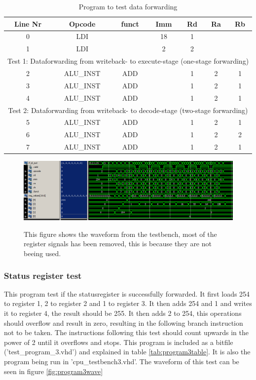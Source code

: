 \documentclass[11pt]{report}
\begin{document}
\begin{table}[htbp]
  \centering
  \begin{tabular}{|c|c|c|c|c|c|c|}
    \hline
    Line Nr &	Opcode		&	funct	&	Imm	&	Rd	&	Ra	&	Rb	\\\hline
    	0	&	LDI			&			&	18	&	1	&		&		\\\hline
    	1	&	LDI			&			&	2	&	2	&		&		\\\hline
	\multicolumn{7}{|c|}{Test 1: Dataforwarding from writeback- to execute-stage (one-stage forwarding)}\\\hline
    	2	&	ALU\_INST	&	ADD		&		&	1	&	2	&	1	\\\hline
    	3	&	ALU\_INST	&	ADD		&		&	1	&	2	&	1	\\\hline
    	4	&	ALU\_INST	&	ADD		&		&	1	&	2	&	1	\\\hline
	\multicolumn{7}{|c|}{Test 2: Dataforwarding from writeback- to decode-stage (two-stage forwarding)}\\\hline
    	5	&	ALU\_INST	&	ADD		&		&	1	&	2	&	1	\\\hline
    	6	&	ALU\_INST	&	ADD		&		&	1	&	2	&	2	\\\hline
    	7	&	ALU\_INST	&	ADD		&		&	1	&	2	&	1	\\\hline
  \end{tabular}
  \caption{Program to test data forwarding}
  \label{tab:program2table}
\end{table}

\begin{figure}
  \centering
  \includegraphics[width=.95\linewidth]{test3.png} \\
  \caption{This figure shows the waveform from the testbench, 
  most of the register signals has been removed, this is because they are not beeing used.}
  \label{fig:program2wave}
\end{figure}

\subsubsection*{Status register test}

This program test if the statusregister is successfully forwarded.
It first loads 254 to register 1, 2 to register 2 and 1 to register 3.
It then adds 254 and 1 and writes it to register 4, the result should be
255. It then adds 2 to 254, this operations should overflow and result in zero,
resulting in the following branch instruction not to be taken. The instructions
following this test should count upwards in the power of 2 until it overflows
and stops. This program is included as a bitfile ('test\_program\_3.vhd') and
explained in table \ref{tab:program3table}. It is also the program being run in 'cpu\_testbench3.vhd'.
The waveform of this test can be seen in figure \ref{fig:program3wave}
\end{document}
